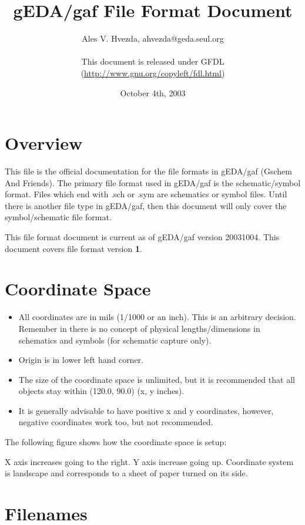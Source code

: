 \documentclass{article}
\title{gEDA/gaf File Format Document}
\author{Ales V. Hvezda, ahvezda@geda.seul.org\\
        \\
        This document is released under GFDL\\
	(\url{http://www.gnu.org/copyleft/fdl.html})}
\date{October 4th, 2003}
\begin{document}
\maketitle
\newpage

\tableofcontents
\newpage


\section{Overview}

This file is the official documentation for the file formats in gEDA/gaf
(Gschem And Friends).  The primary file format used in gEDA/gaf is the
schematic/symbol format.  Files which end with .sch or .sym are schematics
or symbol files.  Until there is another file type in gEDA/gaf, then this
document will only cover the symbol/schematic file format.  

This file format document is current as of gEDA/gaf version 20031004.  This
document covers file format version {\bf 1}.


\section{Coordinate Space}
\begin{itemize}
 \item All coordinates are in mils (1/1000 or an inch).  This is an arbitrary decision. Remember in there is no concept of physical lengths/dimensions in schematics
and symbols (for schematic capture only).  
 \item Origin is in lower left hand corner.
 \item The size of the coordinate space is unlimited, but it is recommended that all objects stay within (120.0, 90.0) (x, y inches).
 \item It is generally advisable to have positive x and y coordinates, however, negative coordinates work too, but not recommended.
\end{itemize}

The following figure shows how the coordinate space is setup:

\begin{center}
\end{center}

X axis increases going to the right.  Y axis increase going up.
Coordinate system is landscape and corresponds to a sheet of paper turned
on its side.


\section{Filenames}
\end{document}
